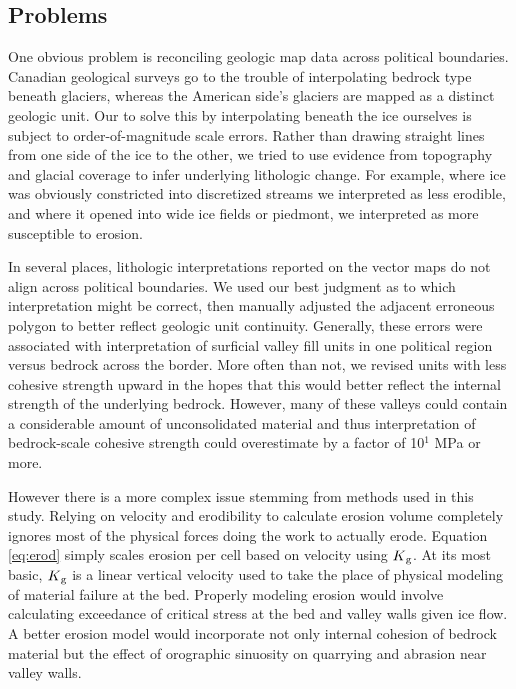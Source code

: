 \documentclass[twocolumn]{aastex6}
\begin{document}
	\subsection{Problems}\label{ss:problems}
		One obvious problem is reconciling geologic map data across political boundaries. Canadian geological surveys go to the trouble of interpolating bedrock type beneath glaciers, whereas the American side's glaciers are mapped as a distinct geologic unit. Our to solve this by interpolating beneath the ice ourselves is subject to order-of-magnitude scale errors. Rather than drawing straight lines from one side of the ice to the other, we tried to use evidence from topography and glacial coverage to infer underlying lithologic change. For example, where ice was obviously constricted into discretized streams we interpreted as less erodible, and where it opened into wide ice fields or piedmont, we interpreted as more susceptible to erosion.
	
		In several places, lithologic interpretations reported on the vector maps do not align across political boundaries. We used our best judgment as to which interpretation might be correct, then manually adjusted the adjacent erroneous polygon to better reflect geologic unit continuity. Generally, these errors were associated with interpretation of surficial valley fill units in one political region versus bedrock across the border. More often than not, we revised units with less cohesive strength upward in the hopes that this would better reflect the internal strength of the underlying bedrock. However, many of these valleys could contain a considerable amount of unconsolidated material and thus interpretation of bedrock-scale cohesive strength could overestimate by a factor of 10$^1$ MPa or more.
		
		However there is a more complex issue stemming from methods used in this study. Relying on velocity and erodibility to calculate erosion volume completely ignores most of the physical forces doing the work to actually erode. Equation \eqref{eq:erod} simply scales erosion per cell based on velocity using $K\textsubscript{g}$\label{txt:Kg}. At its most basic, $K\textsubscript{g}$ is a linear vertical velocity used to take the place of physical modeling of material failure at the bed. Properly modeling erosion would involve calculating exceedance of critical stress at the bed and valley walls given ice flow. A better erosion model would incorporate not only internal cohesion of bedrock material but the effect of orographic sinuosity on quarrying and abrasion near valley walls.
\end{document}
